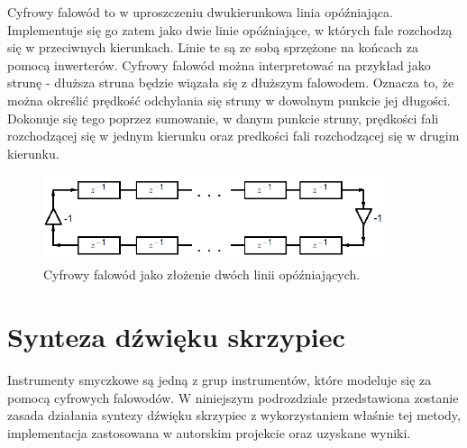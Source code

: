 Cyfrowy falowód to w uproszczeniu dwukierunkowa linia opóźniająca. Implementuje się go zatem jako dwie linie opóźniające, w których fale rozchodzą się w przeciwnych kierunkach. Linie te są ze sobą sprzężone na końcach za pomocą inwerterów. Cyfrowy falowód można interpretować na przykład jako strunę - dłuższa struna będzie wiązała się z dłuższym falowodem. Oznacza to, że można określić prędkość odchylania się struny w dowolnym punkcie jej długości. Dokonuje się tego poprzez sumowanie, w danym punkcie struny, prędkości fali rozchodzącej się w jednym kierunku oraz predkości fali rozchodzącej się w drugim kierunku.
\begin{figure}[H]
	\centering
	\includegraphics[width=10cm]{grafiki/model_falowod}
	\captionsetup{justification=centering}
	\caption{Cyfrowy falowód jako złożenie dwóch linii opóźniających.}
	\label{rys:model_falowod}
\end{figure}
\section{Synteza dźwięku skrzypiec}
Instrumenty smyczkowe są jedną z grup instrumentów, które modeluje się za pomocą cyfrowych falowodów. W niniejszym podrozdziale przedstawiona zostanie zasada działania syntezy dźwięku skrzypiec z wykorzystaniem właśnie tej metody, implementacja zastosowana w autorskim projekcie oraz uzyskane wyniki.

